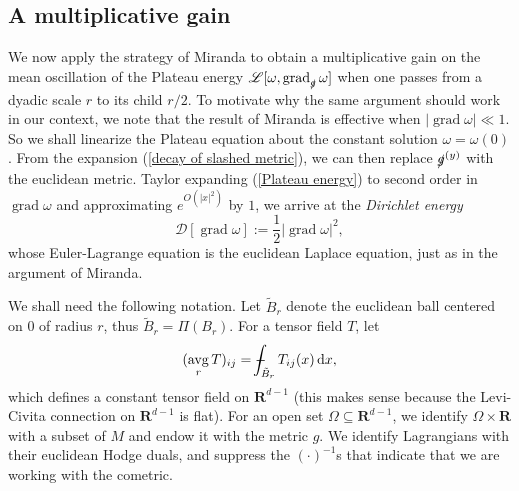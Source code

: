 \documentclass[reqno,12pt,letterpaper]{amsart}
\newcommand{\RR}{\mathbf{R}}
\DeclareMathOperator{\avg}{avg}
\newcommand*\dif{\mathop{}\!\mathrm{d}}
\DeclareMathOperator{\grad}{grad}
\newcommand{\Lagrange}{\mathscr L}
\newcommand{\DirL}{\mathscr D}
\newcommand{\dfn}[1]{\emph{#1}\index{#1}}
\theoremstyle{definition}
\numberwithin{equation}{section}
\def\Xint#1{\mathchoice
{\XXint\displaystyle\textstyle{#1}}%
{\XXint\textstyle\scriptstyle{#1}}%
{\XXint\scriptstyle\scriptscriptstyle{#1}}%
{\XXint\scriptscriptstyle\scriptscriptstyle{#1}}%
\!\int}
\def\XXint#1#2#3{{\setbox0=\hbox{$#1{#2#3}{\int}$ }
\vcenter{\hbox{$#2#3$ }}\kern-.6\wd0}}
\def\dashint{\Xint-}
\begin{document}
\subsection{A multiplicative gain}
We now apply the strategy of Miranda \cite[Teorema 4.3]{Miranda66} to obtain a multiplicative gain on the mean oscillation of the Plateau energy $\Lagrange[\omega, \grad_{\slashed g} \omega]$ when one passes from a dyadic scale $r$ to its child $r/2$.
To motivate why the same argument should work in our context, we note that the result of Miranda is effective when $|\grad \omega| \ll 1$.
So we shall linearize the Plateau equation about the constant solution $\omega = \omega(0)$.
From the expansion (\ref{decay of slashed metric}), we can then replace $\slashed g^{(y)}$ with the euclidean metric. Taylor expanding (\ref{Plateau energy}) to second order in $\grad \omega$ and approximating $e^{O(|x|^2)}$ by $1$, we arrive at the \dfn{Dirichlet energy}
$$\DirL[\grad \omega] := \frac{1}{2} |\grad \omega|^2,$$
whose Euler-Lagrange equation is the euclidean Laplace equation, just as in the argument of Miranda.

We shall need the following notation.
Let $\tilde B_r$ denote the euclidean ball centered on $0$ of radius $r$, thus $\tilde B_r = \Pi(B_r)$.
For a tensor field $T$, let
$$(\avg_r T)_{ij} = \dashint_{\tilde B_r} T_{ij}(x) \dif x,$$
which defines a constant tensor field on $\RR^{d - 1}$ (this makes sense because the Levi-Civita connection on $\RR^{d - 1}$ is flat).
For an open set $\Omega \subseteq \RR^{d - 1}$, we identify $\Omega \times \RR$ with a subset of $M$ and endow it with the metric $g$.
We identify Lagrangians with their euclidean Hodge duals, and suppress the $(\cdot)^{-1}$s that indicate that we are working with the cometric.
\end{document}
